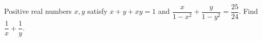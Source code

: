 Positive real numbers $x,y$ satisfy $x+y+xy=1$ and $\dfrac{x}{1-x^2}+\dfrac{y}{1-y^2}=\dfrac{25}{24}$. Find $\dfrac{1}{x}+\dfrac{1}{y}$.
